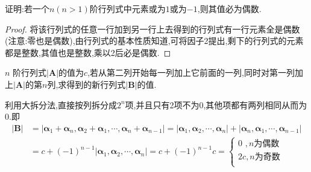 \documentclass[../../main.tex]{subfiles}
\begin{document}
\begin{example}
证明:若一个\(n(n>1)\)阶行列式中元素或为\(1\)或为\(-1\),则其值必为偶数.
\end{example}
\begin{proof}
将该行列式的任意一行加到另一行上去得到的行列式有一行元素全是偶数(注意:零也是偶数),由行列式的基本性质知道,可将因子2提出,剩下的行列式的元素都是整数,其值也是整数,乘以2后必是偶数.

\end{proof}

\begin{example}
\(n\) 阶行列式\(\vert \boldsymbol{A}\vert\)的值为\(c\),若从第二列开始每一列加上它前面的一列,同时对第一列加上\(\vert \boldsymbol{A}\vert\)的第\(n\)列,求得到的新行列式\(\vert \boldsymbol{B}\vert\)的值.
\end{example}
\begin{solution}
利用大拆分法,直接按列拆分成$2^n$项,并且只有2项不为0,其他项都有两列相同从而为0.即
\begin{align*}
\left| \boldsymbol{B} \right|&=\left| \boldsymbol{\alpha }_1+\boldsymbol{\alpha }_n,\boldsymbol{\alpha }_2+\boldsymbol{\alpha }_1,\cdots ,\boldsymbol{\alpha }_n+\boldsymbol{\alpha }_{n-1} \right|
=\left| \boldsymbol{\alpha }_1,\boldsymbol{\alpha }_2,\cdots ,\boldsymbol{\alpha }_n \right|+\left| \boldsymbol{\alpha }_n,\boldsymbol{\alpha }_1,\cdots ,\boldsymbol{\alpha }_{n-1} \right|
\\
&=c+\left( -1 \right) ^{n-1}\left| \boldsymbol{\alpha }_1,\boldsymbol{\alpha }_2,\cdots ,\boldsymbol{\alpha }_n \right|
=c+\left( -1 \right) ^{n-1}c
=\begin{cases}
0 \,\,,n\text{为偶数}\\
2c,n\text{为奇数}\\
\end{cases}
\end{align*}

\end{solution}
\end{document}
